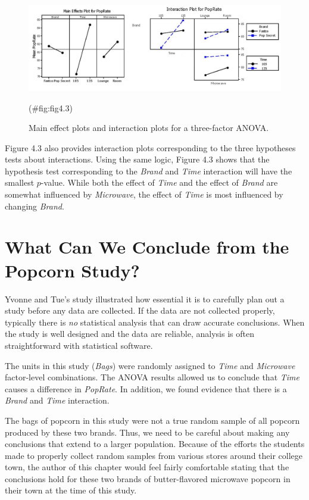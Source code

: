 \documentclass[
]{report}
\begin{document}
\begin{figure}

{\centering \includegraphics[width=0.8\linewidth]{docs/Fig4_3MainInteractionPlots} 

}

\caption{Main effect plots and interaction plots for a three-factor ANOVA.}(\#fig:fig4.3)
\end{figure}

Figure 4.3 also provides interaction plots corresponding to the three hypotheses tests about interactions. Using the same logic, Figure 4.3 shows that the hypothesis test corresponding to the \emph{Brand} and \emph{Time} interaction will have the smallest \(p\)-value. While both the effect of \emph{Time} and the effect of \emph{Brand} are somewhat influenced by \emph{Microwave}, the effect of \emph{Time} is most influenced by changing \emph{Brand}.

\section{\texorpdfstring{\textbf{What Can We Conclude from the Popcorn Study?}}{What Can We Conclude from the Popcorn Study?}}\label{what-can-we-conclude-from-the-popcorn-study}

Yvonne and Tue's study illustrated how essential it is to carefully plan out a study before any data are collected. If the data are not collected properly, typically there is \emph{no} statistical analysis that can draw accurate conclusions. When the study is well designed and the data are reliable, analysis is often straightforward with statistical software.

The units in this study (\emph{Bags}) were randomly assigned to \emph{Time} and \emph{Microwave} factor-level combinations. The ANOVA results allowed us to conclude that \emph{Time} causes a difference in \emph{PopRate}. In addition, we found evidence that there is a \emph{Brand} and \emph{Time} interaction.

The bags of popcorn in this study were not a true random sample of all popcorn produced by these two brands. Thus, we need to be careful about making any conclusions that extend to a larger population. Because of the efforts the students made to properly collect random samples from various stores around their college town, the author of this chapter would feel fairly comfortable stating that the conclusions hold for these two brands of butter-flavored microwave popcorn in their town at the time of this study.
\end{document}
